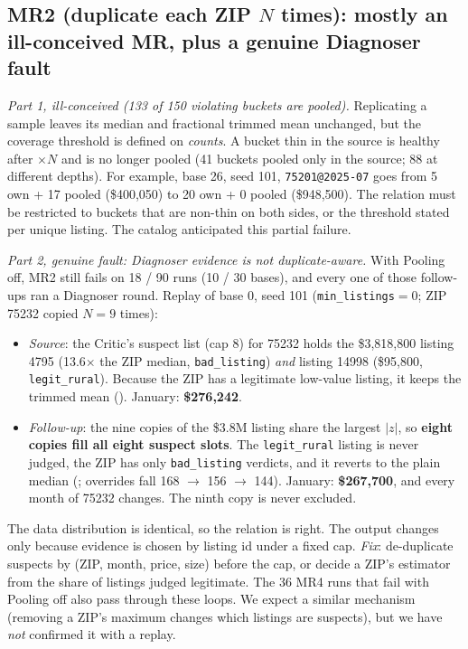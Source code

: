 \documentclass[11pt,a4paper]{article}
\newcommand{\file}[1]{\texttt{\detokenize{#1}}}
\begin{document}
\subsection*{MR2 (duplicate each ZIP $N$ times): mostly an ill-conceived MR, plus a genuine Diagnoser fault}
\emph{Part 1, ill-conceived (133 of 150 violating buckets are pooled).} Replicating a sample leaves its median and
fractional trimmed mean unchanged, but the coverage threshold is defined on \emph{counts}. A bucket thin in the source
is healthy after $\times N$ and is no longer pooled (41 buckets pooled only in the source; 88 at different depths). For
example, base 26, seed 101, \texttt{75201@2025-07} goes from 5 own + 17 pooled (\$400,050) to 20 own + 0 pooled
(\$948,500). The relation must be restricted to buckets that are non-thin on both sides, or the threshold stated per
unique listing. The catalog anticipated this partial failure.

\emph{Part 2, genuine fault: Diagnoser evidence is not duplicate-aware.} With Pooling off, MR2 still fails on
18 / 90 runs (10 / 30 bases), and every one of those follow-ups ran a Diagnoser round. Replay of base 0, seed 101
(\texttt{min\_listings}$=0$; ZIP 75232 copied $N=9$ times):
\begin{itemize}
  \item \emph{Source}: the Critic's suspect list (cap 8) for 75232 holds the \$3,818,800 listing 4795 (13.6$\times$ the
  ZIP median, \texttt{bad\_listing}) \emph{and} listing 14998 (\$95,800, \texttt{legit\_rural}). Because the ZIP has a
  legitimate low-value listing, it keeps the trimmed mean (\file{diagnoser.py:153}). January: \textbf{\$276,242}.
  \item \emph{Follow-up}: the nine copies of the \$3.8M listing share the largest $|z|$, so \textbf{eight copies fill all
  eight suspect slots}. The \texttt{legit\_rural} listing is never judged, the ZIP has only \texttt{bad\_listing}
  verdicts, and it reverts to the plain median (\file{diagnoser.py:154--157}; overrides fall 168 $\rightarrow$ 156
  $\rightarrow$ 144). January: \textbf{\$267,700}, and every month of 75232 changes. The ninth copy is never excluded.
\end{itemize}
The data distribution is identical, so the relation is right. The output changes only because evidence is chosen by
listing id under a fixed cap. \emph{Fix}: de-duplicate suspects by (ZIP, month, price, size) before the cap, or decide a
ZIP's estimator from the share of listings judged legitimate. The 36 MR4 runs that fail with Pooling off also pass
through these loops. We expect a similar mechanism (removing a ZIP's maximum changes which listings are suspects), but
we have \emph{not} confirmed it with a replay.
\end{document}

